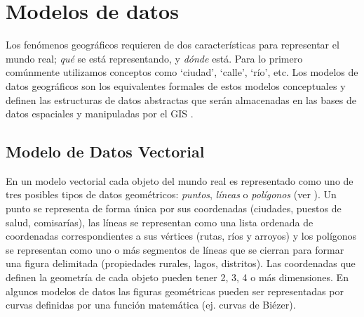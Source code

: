 
%	


\section{Modelos de datos}

Los fenómenos geográficos requieren de dos características para representar el mundo real; \emph{qué} se está representando, y \emph{dónde} está. Para lo primero comúnmente utilizamos conceptos como `ciudad', `calle', `río', etc. Los modelos de datos geográficos son los equivalentes formales de estos modelos conceptuales y definen las estructuras de datos abstractas que serán almacenadas en las bases de datos espaciales y manipuladas por el GIS \cite{burrough1998principles}.

\subsection{Modelo de Datos Vectorial}

En un modelo vectorial cada objeto del mundo real es representado como uno de tres posibles tipos de datos geométricos: \emph{puntos}, \emph{líneas} o \emph{polígonos} (ver ). Un punto se representa de forma única por sus coordenadas (ciudades, puestos de salud, comisarías), las líneas se representan como una lista ordenada de coordenadas correspondientes a sus vértices (rutas, ríos y arroyos) y los polígonos se representan como uno o más segmentos de líneas que se cierran para formar una figura delimitada (propiedades rurales, lagos, distritos). Las coordenadas que definen la geometría de cada objeto pueden tener 2, 3, 4 o más dimensiones. En algunos modelos de datos las figuras geométricas pueden ser representadas por curvas definidas por una función matemática (ej. curvas de Biézer).

